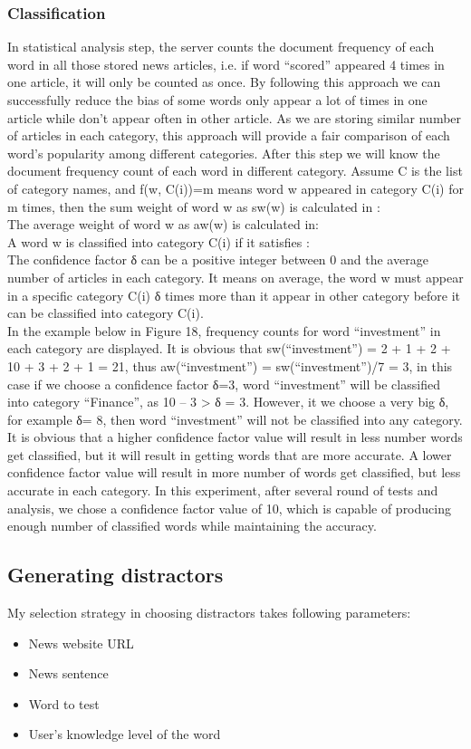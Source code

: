 \subsubsection{Classification}
In statistical analysis step, the server counts the document frequency of each word in all those stored news articles, i.e. if word “scored” appeared 4 times in one article, it will only be counted as once. By following this approach we can successfully reduce the bias of some words only appear a lot of times in one article while don’t appear often in other article. As we are storing similar number of articles in each category, this approach will provide a fair comparison of each word’s popularity among different categories. After this step we will know the document frequency count of each word in different category. 
Assume C is the list of category names, and f(w, C(i))=m means word w appeared in category C(i) for m times, then the sum weight of word w as sw(w) is calculated in :
\\
The average weight of word w as aw(w) is calculated in:
\\
A word w is classified into category C(i) if it satisfies :
\\
The confidence factor δ can be a positive integer between 0 and the average number of articles in each category. It means on average, the word w must appear in a specific category C(i) δ times more than it appear in other category before it can be classified into category C(i).
\\
In the example below in Figure 18, frequency counts for word “investment” in each category are displayed. It is obvious that sw(“investment”) = 2 + 1 + 2 + 10 + 3 + 2 + 1 = 21, thus aw(“investment”) = sw(“investment”)/7 = 3, in this case if we choose a confidence factor δ=3, word “investment” will be classified into category “Finance”, as 10 – 3 > δ = 3. However, it we choose a very big δ, for example δ= 8, then word “investment” will not be classified into any category.
\\
It is obvious that a higher confidence factor value will result in less number words get classified, but it will result in getting words that are more accurate. A lower confidence factor value will result in more number of words get classified, but less accurate in each category. In this experiment, after several round of tests and analysis, we chose a confidence factor value of 10, which is capable of producing enough number of classified words while maintaining the accuracy.
\subsection{Generating distractors}
My selection strategy in choosing distractors takes following parameters:
\begin{itemize}
\item News website URL
\item News sentence
\item Word to test
\item User’s knowledge level of the word
\end{itemize}
